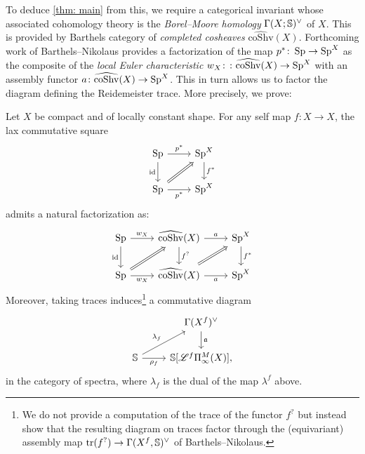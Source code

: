 To deduce \cref{thm: main} from this,
we require a categorical invariant whose associated cohomology
theory is the \emph{Borel--Moore homology} $\Gamma(X;\mathbb{S})^{\vee}$ of $X$.
This is provided by Barthels category of \emph{completed cosheaves}
$\widehat{\mathrm{coShv}}(X)$. Forthcoming work of Barthels--Nikolaus
provides a factorization of the map $p^*\colon \operatorname{Sp} \to \operatorname{Sp}^X$ as the composite of 
the \emph{local Euler characteristic} $w_X\colon \colon \widehat{\mathrm{coShv}}(X) \to \operatorname{Sp}^X$ with an assembly functor
$a \colon \widehat{\mathrm{coShv}}(X)\to \operatorname{Sp}^X$. This in turn allows 
us to factor the diagram defining the Reidemeister trace. More precisely, we prove:
\begin{thm}
 Let $X$ be compact and of locally constant shape. For any self map $f\colon X \to X$,
 the lax commutative square 
\[
\begin{tikzcd}
	{\Sp} & {\Sp^X} \\
  {\Sp} & {\Sp^X}
	\arrow["{p^{*}}", from=1-1, to=1-2]
	\arrow["{\id}"', from=1-1, to=2-1]
	\arrow["f^*", from=1-2, to=2-2]
	\arrow[Rightarrow, from=2-1, to=1-2]
	\arrow["{p^*}"', from=2-1, to=2-2]
\end{tikzcd}
\]
admits a natural factorization as:
\[
    \begin{tikzcd}
      \Sp & {\widehat{\mathrm{coShv}}(X)} & \Sp^{X} \\
      \Sp & {\widehat{\mathrm{coShv}}(X)} & \Sp^{X}
      \arrow["{w_{X}}", from=1-1, to=1-2]
      \arrow["\id"', from=1-1, to=2-1]
      \arrow["{a }", from=1-2, to=1-3]
      \arrow["{f^?}", from=1-2, to=2-2]
      \arrow["f^{\ast}", from=1-3, to=2-3]
      \arrow[Rightarrow, from=2-2, to=1-3]
      \arrow["{w_{\tset}}"', from=2-1, to=2-2]
      \arrow[Rightarrow, from=2-1, to=1-2]
      \arrow["{a}"', from=2-2, to=2-3]
    \end{tikzcd}
  \]
  Moreover, taking traces induces\footnote{We do not provide a computation of the trace
  of the functor $f^?$ but instead show that the resulting diagram on traces factor through
  the (equivariant) assembly map $\mathrm{tr}(f^?)\to \Gamma(X^f,\mathbb{S})^{\vee}$ of Barthels--Nikolaus.} 
  a commutative diagram
  \[
    \begin{tikzcd}
      &  \Gamma(X^f)^{\vee}\\
      \SS& {\SS [\cL^{f}\ani{\tset}[\base]]},
      \arrow["\mathfrak a", from=1-2, to=2-2]
      \arrow["{\lambda_f}", from=2-1, to=1-2]
      \arrow["{\rho_f}"', from=2-1, to=2-2]
    \end{tikzcd}
  \]
  in the category of spectra, where $\lambda_f$ 
  is the dual of the map $\lambda^f$ above.
\end{thm}



